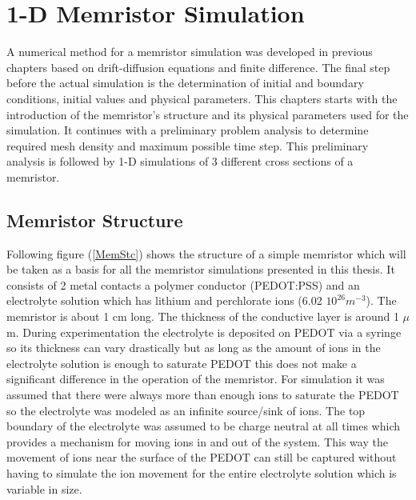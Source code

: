 
\chapter{1-D Memristor Simulation} %

\label{Chapter5} %


A numerical method for a memristor simulation was developed in previous chapters based on drift-diffusion equations and finite difference. The final step before the actual simulation is the determination of initial and boundary conditions, initial values and physical parameters. This chapters starts with the introduction of the memristor's structure and its physical parameters used for the simulation. It continues with a preliminary problem analysis to determine required mesh density and maximum possible time step. This preliminary analysis is followed by 1-D simulations of 3 different cross sections of a memristor.

\section{Memristor Structure}
Following figure (\ref{MemStc}) shows the structure of a simple memristor which will be taken as a basis for all the memristor simulations presented in this thesis. It consists of 2 metal contacts a polymer conductor (PEDOT:PSS) and an electrolyte solution which has lithium and perchlorate ions (6.02 $10^{26} m^{-3}$). The memristor is about 1 cm long. The thickness of the conductive layer is around 1 $\mu$m. During experimentation the electrolyte is deposited on PEDOT via a syringe so its thickness can vary drastically but as long as the amount of ions in the electrolyte solution is enough to saturate PEDOT this does not make a significant difference in the operation of the memristor. For simulation it was assumed that there were always more than enough ions to saturate the PEDOT so the electrolyte was modeled as an infinite source/sink of ions. The top boundary of the electrolyte was assumed to be charge neutral at all times which provides a mechanism for moving ions in and out of the system. This way the movement of ions near the surface of the PEDOT can still be captured without having to simulate the ion movement for the entire electrolyte solution which is variable in size. 

